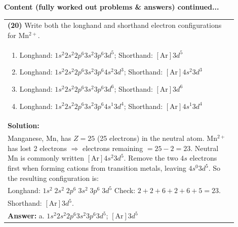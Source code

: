 \documentclass{article}
\begin{document}
{\newpage
\noindent
{\large\textbf{Content (fully worked out problems \& answers) continued...}}\\[0.2em]
\vspace{0.2cm}
\begin{tabular}{|p{0.9\linewidth}|}
\hline
\vspace{0.2cm}
\textbf{(20)} Write both the longhand and shorthand electron configurations for Mn$^{2+}$. \\
\begin{minipage}[t]{0.85\linewidth}
\begin{enumerate}[label=\alph*.]
\item Longhand: $1s^{2}2s^{2}2p^{6}3s^{2}3p^{6}3d^{5}$; Shorthand: $[\text{Ar}]3d^{5}$
\item Longhand: $1s^{2}2s^{2}2p^{6}3s^{2}3p^{6}4s^{2}3d^{3}$; Shorthand: $[\text{Ar}]4s^{2}3d^{3}$
\item Longhand: $1s^{2}2s^{2}2p^{6}3s^{2}3p^{6}3d^{6}$; Shorthand: $[\text{Ar}]3d^{6}$
\item Longhand: $1s^{2}2s^{2}2p^{6}3s^{2}3p^{6}4s^{1}3d^{4}$; Shorthand: $[\text{Ar}]4s^{1}3d^{4}$
\end{enumerate}
\end{minipage}\\
\hline
\vspace{0.2cm}
\textbf{Solution:} \\
Manganese, Mn, has $Z=25$ (25 electrons) in the neutral atom. Mn$^{2+}$ has lost 2 electrons $\Rightarrow$ electrons remaining $=25-2=23$. Neutral Mn is commonly written $[\text{Ar}]4s^{2}3d^{5}$. Remove the two $4s$ electrons first when forming cations from transition metals, leaving $4s^{0}3d^{5}$. So the resulting configuration is: \\
Longhand: $1s^{2}\;2s^{2}\;2p^{6}\;3s^{2}\;3p^{6}\;3d^{5}$
Check: $2+2+6+2+6+5=23$. \\
Shorthand: $[\text{Ar}]3d^{5}$. \\
\hline
\vspace{0.2cm}
\textbf{Answer:} a. $1s^{2}2s^{2}2p^{6}3s^{2}3p^{6}3d^{5}$; $[\text{Ar}]3d^{5}$\\
\hline
\end{tabular}
 
}
\end{document}
